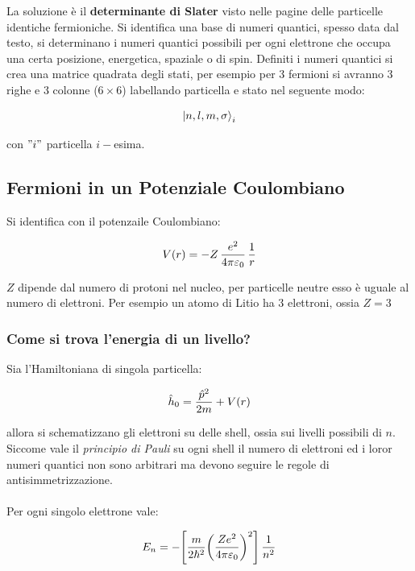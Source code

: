 	La soluzione è il \textbf{determinante di Slater} visto nelle pagine delle particelle identiche fermioniche. Si identifica una base di numeri quantici, spesso data dal testo, si determinano i numeri quantici possibili per ogni elettrone che occupa una certa posizione, energetica, spaziale o di spin. Definiti i numeri quantici si crea una matrice quadrata degli stati, per esempio per 3 fermioni si avranno 3 righe e 3 colonne ($6 \times 6$) labellando particella e stato nel seguente modo:
	
\begin{align*}
	\ket{n, l, m, \sigma}_i
\end{align*}

	con $"i"$ particella $i-$esima.

\subsection{Fermioni in un Potenziale Coulombiano}
		
	Si identifica con il potenzaile Coulombiano:
	
\begin{align*}	
	V\qty(r) = - Z \,\frac{e^2}{4 \pi \varepsilon_0} \, \frac{1}{r}
\end{align*}

	$Z$ dipende dal numero di protoni nel nucleo, per particelle neutre esso è uguale al numero di elettroni. Per esempio un atomo di Litio ha $3$ elettroni, ossia $Z = 3$
	
\subsubsection{Come si trova l'energia di un livello?}

	Sia l'Hamiltoniana di singola particella:
	
\begin{align*}
	\hat{h}_0 = \frac{\hat{p}^2}{2m} + V\qty(r)
\end{align*}

	allora si schematizzano gli elettroni su delle shell, ossia sui livelli possibili di $n$. Siccome vale il \textit{principio di Pauli} su ogni shell il numero di elettroni ed i loror numeri quantici non sono arbitrari ma devono seguire le regole di antisimmetrizzazione.
	\\
	\\
	Per ogni singolo elettrone vale:
	
\begin{align*}
	E_n = - \qty[\frac{m}{2\hbar^2} \qty(\frac{Z e^2}{4\pi \varepsilon_0})^2] \, \frac{1}{n^2}
\end{align*}
	
